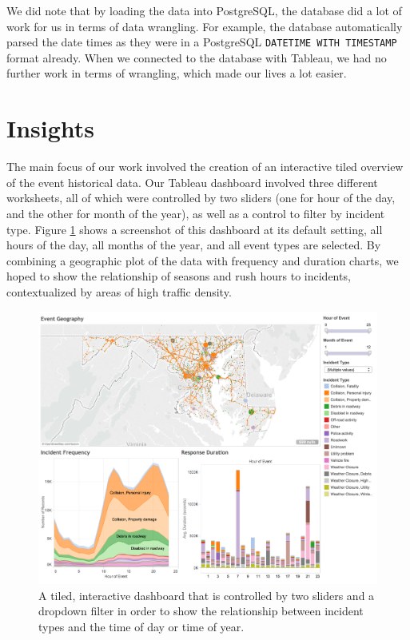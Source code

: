 \documentclass[11pt,letterpaper]{article}
\begin{document}
We did note that by loading the data into PostgreSQL, the database did a lot of work for us in terms of data wrangling. For example, the database automatically parsed the date times as they were in a PostgreSQL \texttt{DATETIME WITH TIMESTAMP} format already. When we connected to the database with Tableau, we had no further work in terms of wrangling, which made our lives a lot easier. 


\section*{Insights}

The main focus of our work involved the creation of an interactive tiled overview of the event historical data. Our Tableau dashboard involved three different worksheets, all of which were controlled by two sliders (one for hour of the day, and the other for month of the year), as well as a control to filter by incident type. Figure \ref{fig:dashboard} shows a screenshot of this dashboard at its default setting, all hours of the day, all months of the year, and all event types are selected. By combining a geographic plot of the data with frequency and duration charts, we hoped to show the relationship of seasons and rush hours to incidents, contextualized by areas of high traffic density. 

\begin{figure}
	\centering
    \includegraphics[width=\textwidth]{figures/dashboard.png}
    \caption{\textsf{A tiled, interactive dashboard that is controlled by two sliders and a dropdown filter in order to show the relationship between incident types and the time of day or time of year.}}
    \label{fig:dashboard}
\end{figure}
\end{document}
